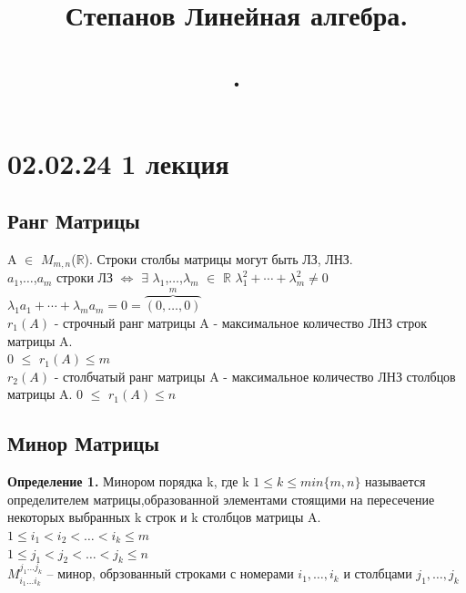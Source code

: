 \documentclass[a4paper,12pt]{article} %
\title{
	Степанов Линейная алгебра.
	\date{}.
}
\begin{document}
	\maketitle
	\tableofcontents
	\section{02.02.24 1 лекция}
	\subsection{Ранг Матрицы}
	
	\noindent A $\in$ $M_{m,n}$($\mathbb{R}$).
	Строки столбы матрицы могут быть ЛЗ, ЛНЗ.\\
	
	\noindent $a_1$,$\dotso$,$a_m$ строки ЛЗ $\iff$ $\exists$ $\lambda_1$,$\dotso$,$\lambda_m$ $\in$ $\mathbb{R}$ $ \lambda_1^2 + \dotsb + \lambda_m^2 \neq 0 $ \\
	$\lambda_1 a_1 + \dotsb + \lambda_m a_m = 0 = \overbrace{(0,\dotso,0)}^{m} $\\
	
	\noindent$r_1(A)$ - строчный ранг матрицы A - максимальное количество ЛНЗ строк матрицы A.\\
	0 $\leq$ $r_1(A) \leq m$ \\
	
	\noindent$r_2(A)$ - столбчатый ранг матрицы A - максимальное количество ЛНЗ столбцов матрицы A. 
	0 $\leq$ $r_1(A) \leq n$\\
	\subsection{Минор Матрицы}
	\textbf{Определение 1.} Минором порядка k, где k $1\leq k \leq min\{m,n\}$ называется определителем матрицы,образованной элементами стоящими на пересечение некоторых выбранных k строк и k столбцов матрицы A. \\
	$1 \leq i_1 < i_2 < \dotso < i_k \leq m $\\
	$1 \leq j_1 < j_2 < \dotso < j_k \leq n $\\
	
	$M_{i_1 \dotso i_k}^{j_1 \dotso j_k}$ -- минор, обрзованный строками с номерами $i_1, \dotso, i_k$ и столбцами $j_1,\dotso, j_k$\\
	
\end{document}
